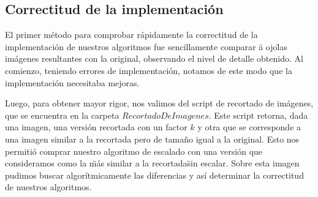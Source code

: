 \subsection{Correctitud de la implementación}

El primer método para comprobar rápidamente la correctitud de la implementación de nuestros algoritmos fue sencillamente comparar \"a ojo\" las imágenes resultantes con la original, observando el nivel de detalle obtenido. Al comienzo, teniendo errores de implementación, notamos de este modo que la implementación necesitaba mejoras.

Luego, para obtener mayor rigor, nos valimos del script de recortado de imágenes, que se encuentra en la carpeta $Recortado De Imagenes$. Este script retorna, dada una imagen, una versión recortada con un factor $k$ y otra que se corresponde a una imagen similar a la recortada pero de tamaño igual a la original. Esto nos permitió comprar nuestro algoritmo de escalado con una versión que consideramos como la \"más similar a la recortada\" sin escalar. Sobre esta imagen pudimos buscar algorítmicamente las diferencias y así determinar la correctitud de nuestros algoritmos.
